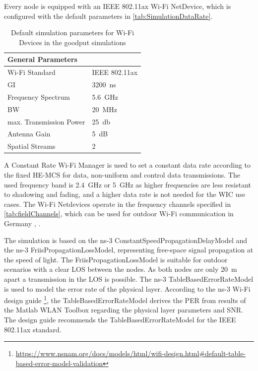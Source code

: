 Every node is equipped with an IEEE 802.11ax Wi-Fi NetDevice, which is configured with the default parameters in
\autoref{tab:SimulationDataRate}.
\begin{table}[H]
   \centering
   \begin{tabular}{p{6cm}p{4cm}}
      General Parameters & \\
      \midrule
      Wi-Fi Standard & IEEE 802.11ax\\
      \ac{GI} & \SI{3200}{\nano\second}\\
      Frequency Spectrum & \SI{5.6}{\giga\hertz}\\
      \ac{BW} & \SI{20}{\mega\hertz}\\
      max. Transmission Power & \SI{25}{\decibel}\\
      Antenna Gain & \SI{5}{\dB}\\
      Spatial Streams & 2\\
      \bottomrule
   \end{tabular}
   \caption{Default simulation parameters for Wi-Fi Devices in the goodput simulations}
   \label{tab:SimulationDataRate}
\end{table}

A Constant Rate Wi-Fi Manager is used to set a constant data rate according to the fixed \ac{HE}-\ac{MCS} for data, non-uniform and control data transmissions.
The used frequency band is \SI{2.4}{\giga\hertz} or \SI{5}{\giga\hertz} as higher frequencies are less resistant to shadowing and fading, and a higher data rate is not needed for the \ac{WIC} use cases.
The Wi-Fi Netdevices operate in the frequency channels specified in \autoref{tab:fieldChannels}, which can be used for
outdoor Wi-Fi communication in Germany \cite{freq_plan_24G}, \cite{freq_plan_5G}.

The simulation is based on the ns-3 ConstantSpeedPropagationDelayModel and the  ns-3 FriisPropagationLossModel,
representing free-space signal propagation at the speed of light.
The FriisPropagationLossModel is suitable for outdoor scenarios with a clear \ac{LOS} between the nodes.
As both nodes are only \SI{20}{\metre} apart a transmission in the \ac{LOS} is possible.
The ns-3 TableBasedErrorRateModel is used to model the error rate of the physical layer.
According to the ns-3 Wi-Fi design guide \footnote{\url{https://www.nsnam.org/docs/models/html/wifi-design.html\#default-table-based-error-model-validation}},
the TableBasedErrorRateModel derives the \ac{PER} from results of the Matlab WLAN Toolbox
regarding the physical layer parameters and \ac{SNR}.
The design guide recommends the TableBasedErrorRateModel for the IEEE 802.11ax standard.

